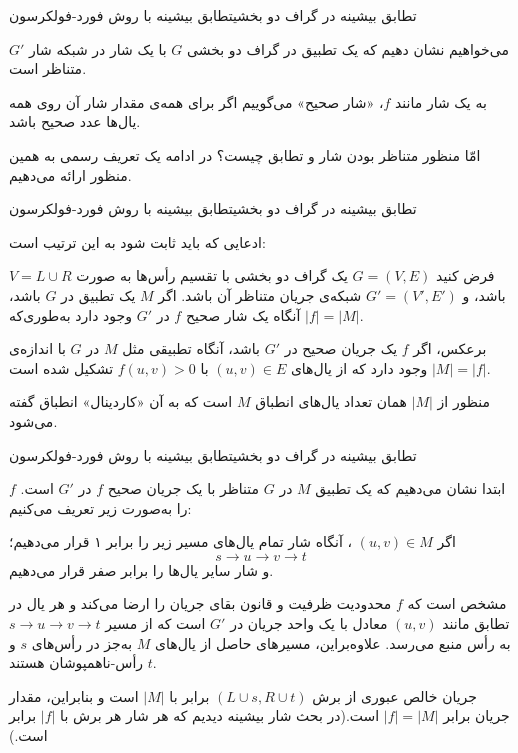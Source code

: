\begin{itemframe-s}{تطابق بیشینه در گراف دو بخشی}{تطابق بیشینه با روش فورد-فولکرسون}
\item[-]
می‌خواهیم نشان دهیم که یک تطبیق در گراف دو بخشی $G$ با یک شار در شبکه شار $G'$ متناظر است.
\item[-]
به یک شار مانند $f$، «شار صحیح»
 می‌گوییم اگر برای همه‌ی مقدار شار آن روی همه یال‌ها عدد صحیح باشد.
\item[-]
امّا منظور متناظر بودن شار و تطابق چیست؟ در ادامه یک تعریف رسمی به همین منظور ارائه می‌دهیم.
\end{itemframe-s}


\begin{itemframe-s}{تطابق بیشینه در گراف دو بخشی}{تطابق بیشینه با روش فورد-فولکرسون}
\item[-]
ادعایی که باید ثابت شود به این ترتیب است:
\item[-]
فرض کنید $G = (V, E)$ یک گراف دو بخشی با تقسیم رأس‌ها به صورت $V = L \cup R$ باشد، و $G' = (V', E')$ شبکه‌ی جریان متناظر آن باشد. اگر $M$ یک تطبیق در $G$ باشد، آنگاه یک شار صحیح $f$ در $G'$ وجود دارد به‌طوری‌که $|f| = |M|$.
\item[-]
 برعکس، اگر $f$ یک جریان صحیح در $G'$ باشد، آنگاه تطبیقی مثل $M$ در $G$ با اندازه‌ی
$|M| = |f|$
وجود دارد که از یال‌های $(u, v) \in E$ با
 $f(u, v) > 0$
 تشکیل شده است.
\item[-]
منظور از $|M|$ همان تعداد یال‌های انطباق $M$ است که به آن «کاردینال»
 انطباق گفته می‌شود.
\end{itemframe-s}


\begin{itemframe-s}{تطابق بیشینه در گراف دو بخشی}{تطابق بیشینه با روش فورد-فولکرسون}
\item[-]
ابتدا نشان می‌دهیم که یک تطبیق $M$ در $G$ متناظر با یک جریان صحیح $f$ در $G'$ است. $f$ را به‌صورت زیر تعریف می‌کنیم:
\item[-]
اگر
$(u, v) \in M$
، آنگاه شار تمام یال‌های مسیر زیر را برابر ۱ قرار می‌دهیم؛
$$s \to u \to v \to t$$
 و شار سایر یال‌ها را برابر صفر قرار می‌دهیم.
\item[-]

مشخص است که $f$ محدودیت ظرفیت و قانون بقای جریان را ارضا می‌کند و هر یال در تطابق مانند
$(u, v)$
معادل با یک واحد جریان در $G'$ است که از مسیر
$s \to u \to v \to t$
به رأس منبع می‌رسد. علاوه‌براین، مسیرهای حاصل از یال‌های $M$ به‌جز در رأس‌های $s$ و $t$ رأس‌-ناهمپوشان هستند.
\item[-]
 جریان خالص عبوری از برش
$(L \cup {s}, R \cup {t})$
برابر با $|M|$ است و بنابراین، مقدار جریان برابر
 $|f| = |M|$
 است.(در بحث شار بیشینه دیدیم که هر شار هر برش با $|f|$ برابر است.)
\end{itemframe-s}


